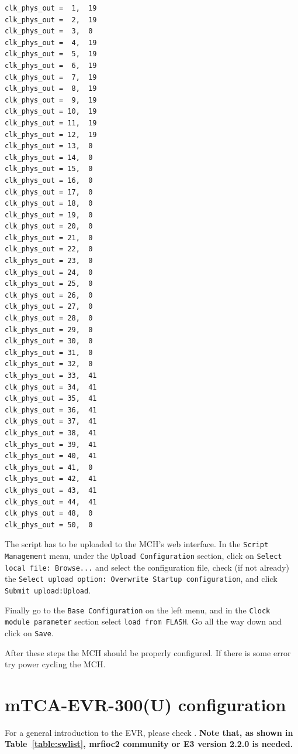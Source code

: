 \documentclass[11pt
  , a4paper
  , article
  , oneside
  , showtrims
]{memoir}
\begin{document}
\begin{lstlisting}[style=termstyle]
clk_phys_out =  1,  19
clk_phys_out =  2,  19
clk_phys_out =  3,  0
clk_phys_out =  4,  19
clk_phys_out =  5,  19
clk_phys_out =  6,  19
clk_phys_out =  7,  19
clk_phys_out =  8,  19
clk_phys_out =  9,  19
clk_phys_out = 10,  19
clk_phys_out = 11,  19
clk_phys_out = 12,  19
clk_phys_out = 13,  0
clk_phys_out = 14,  0
clk_phys_out = 15,  0
clk_phys_out = 16,  0
clk_phys_out = 17,  0
clk_phys_out = 18,  0
clk_phys_out = 19,  0
clk_phys_out = 20,  0
clk_phys_out = 21,  0
clk_phys_out = 22,  0
clk_phys_out = 23,  0
clk_phys_out = 24,  0
clk_phys_out = 25,  0
clk_phys_out = 26,  0
clk_phys_out = 27,  0
clk_phys_out = 28,  0
clk_phys_out = 29,  0
clk_phys_out = 30,  0
clk_phys_out = 31,  0
clk_phys_out = 32,  0
clk_phys_out = 33,  41
clk_phys_out = 34,  41
clk_phys_out = 35,  41
clk_phys_out = 36,  41
clk_phys_out = 37,  41
clk_phys_out = 38,  41
clk_phys_out = 39,  41
clk_phys_out = 40,  41
clk_phys_out = 41,  0
clk_phys_out = 42,  41
clk_phys_out = 43,  41
clk_phys_out = 44,  41
clk_phys_out = 48,  0
clk_phys_out = 50,  0

\end{lstlisting}

The script has to be uploaded to the MCH's web interface. In the \texttt{Script Management} menu, under the \texttt{Upload Configuration} section, click on \texttt{Select local file: Browse...} and select the configuration file, check (if not already) the \texttt{Select upload option: Overwrite Startup configuration}, and click \texttt{Submit upload:Upload}.

Finally go to the \texttt{Base Configuration} on the left menu, and in the \texttt{Clock module parameter} section select \texttt{load from FLASH}. Go all the way down and click on \texttt{Save}.

After these steps the MCH should be properly configured. If there is some error try power cycling the MCH.


\section{mTCA-EVR-300(U) configuration}
For a general introduction to the EVR, please check \citep{EVRMANUAL}. \textbf{Note that, as shown in Table~\ref{table:swlist}, mrfioc2 community or E3 version 2.2.0 is needed.}
\end{document}
